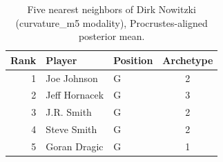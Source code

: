 \begin{table}[htbp]
  \centering\small
  \begin{tabular}{rllc}
    \toprule
    Rank & Player & Position & Archetype \\
    \midrule
    1 & Joe Johnson & G & 2 \\
    2 & Jeff Hornacek & G & 3 \\
    3 & J.R. Smith & G & 2 \\
    4 & Steve Smith & G & 2 \\
    5 & Goran Dragic & G & 1 \\
    \bottomrule
  \end{tabular}
  \caption{Five nearest neighbors of Dirk Nowitzki (curvature_m5 modality), Procrustes-aligned posterior mean.}
  \label{tab:Dirk_Nowitzki_neighbors_curvature_m5}
\end{table}

